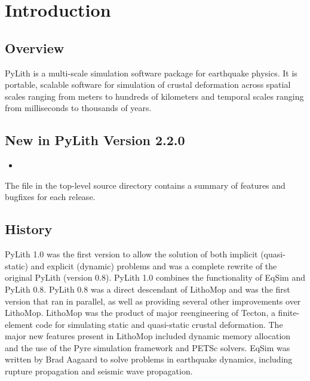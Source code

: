 
\chapter{Introduction}


\section{Overview}

PyLith is a multi-scale simulation software package for earthquake
physics. It is portable, scalable software for simulation of crustal
deformation across spatial scales ranging from meters to hundreds
of kilometers and temporal scales ranging from milliseconds to thousands
of years.


\section{New in PyLith Version 2.2.0}
\begin{itemize}
\item {}
\end{itemize}
The  file in the top-level source directory contains
a summary of features and bugfixes for each release.


\section{History}

PyLith 1.0 was the first version to allow the solution of both
implicit (quasi-static) and explicit (dynamic) problems and was a
complete rewrite of the original PyLith (version 0.8). PyLith 1.0
combines the functionality of EqSim
\cite{Aagaard:etal:2001a,Aagaard:etal:2001b} and PyLith 0.8. PyLith
0.8 was a direct descendant of LithoMop and was the first version that
ran in parallel, as well as providing several other improvements over
LithoMop. LithoMop was the product of major reengineering of Tecton, a
finite-element code for simulating static and quasi-static crustal
deformation. The major new features present in LithoMop included
dynamic memory allocation and the use of the Pyre simulation framework
and PETSc solvers. EqSim was written by Brad Aagaard to solve problems
in earthquake dynamics, including rupture propagation and seismic wave
propagation.

